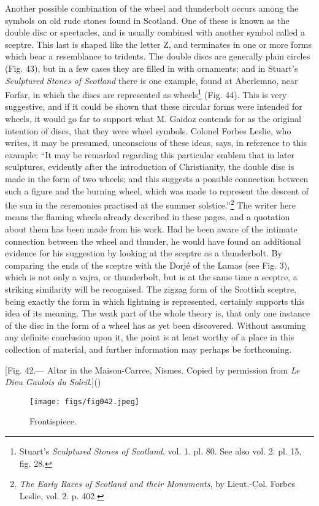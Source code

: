 \documentclass[a4paper, 11pt, oneside, polutonikogreek, english]{article}
\begin{document}
Another possible combination of the wheel and thunderbolt occurs among the symbols on old rude stones found in Scotland. One of these is known as the double disc or spectacles, and is usually combined with another symbol called a sceptre. This last is shaped like the letter Z, and terminates in one or more forms which bear a resemblance to tridents. The double discs are generally plain circles (Fig. 43), but in a few cases they are filled in with ornaments; and in Stuart's \emph{Sculptured Stones of Scotland} there is one example, found at Aberlemno, near Forfar, in which the discs are represented as wheels\footnote{Stuart's \emph{Sculptured Stones of Scotland}, vol. 1. pl. 80. See also vol. 2. pl. 15, fig. 28.} (Fig. 44). This is very suggestive, and if it could be shown that these circular forms were intended for wheels, it would go far to support what M. Gaidoz contends for as the original intention of discs, that they were wheel symbols. Colonel Forbes Leslie, who writes, it may be presumed, unconscious of these ideas, says, in reference to this example: ``It may be remarked regarding this particular emblem that in later sculptures, evidently after the introduction of Christianity, the double disc is made in the form of two wheels; and this suggests a possible connection between such a figure and the burning wheel, which was made to represent the descent of the sun in the ceremonies practised at the summer solstice.''\footnote{\emph{The Early Races of Scotland and their Monuments}, by Lieut.-Col. Forbes Leslie, vol. 2. p. 402.} The writer here means the flaming wheels already described in these pages, and a quotation about them has been made from his work. Had he been aware of the intimate connection between the wheel and thunder, he would have found an additional evidence for his suggestion by looking at the sceptre as a thunderbolt. By comparing the ends of the sceptre with the Dorjé of the Lamas (see Fig. 3), which is not only a vajra, or thunderbolt, but is at the same time a sceptre, a striking similarity will be recognised. The zigzag form of the Scottish sceptre, being exactly the form in which lightning is represented, certainly supports this idea of its meaning. The weak part of the whole theory is, that only one instance of the disc in the form of a wheel has as yet been discovered. Without assuming any definite conclusion upon it, the point is at least worthy of a place in this collection of material, and further information may perhaps be forthcoming.
 
[Fig. 42.--- Altar in the Maison-Carree, Nismes. Copied by permission from \emph{Le Dieu Gaulois du Soleil}.]()
\begin{figure}[H]
\centering
\texttt{[image: figs/fig042.jpeg]}
\caption{Frontispiece.}
\end{figure}
\end{document}
